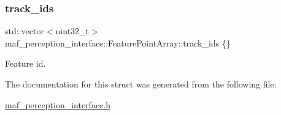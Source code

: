 \subsubsection{\texorpdfstring{track\+\_\+ids}{track\_ids}}
{\footnotesize\ttfamily std\+::vector$<$uint32\+\_\+t$>$ maf\+\_\+perception\+\_\+interface\+::\+Feature\+Point\+Array\+::track\+\_\+ids \{\}}



Feature id. 



The documentation for this struct was generated from the following file\+:\begin{DoxyCompactItemize}
\item 
\hyperlink{maf__perception__interface_8h}{maf\+\_\+perception\+\_\+interface.\+h}\end{DoxyCompactItemize}
